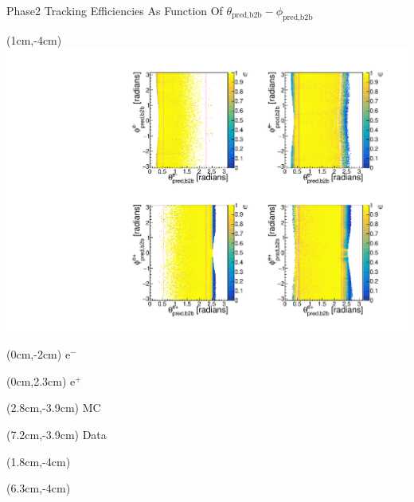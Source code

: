 \documentclass[8pt]{beamer}
\begin{document}
\begin{frame}{Phase2 Tracking Efficiencies As Function Of $\theta_{\textrm{pred,b2b}}-\phi_{\textrm{pred,b2b}}$}
	
	
	
	\begin{textblock*}{9cm}(1cm,-4cm)
		\includegraphics[width=\textwidth]{VPlots/P2/xCEffTP_MCData}
	\end{textblock*}
	
	\begin{textblock*}{2cm}(0cm,-2cm)
		$\textrm{e}^-$
	\end{textblock*}
	
	\begin{textblock*}{2cm}(0cm,2.3cm)
		$\textrm{e}^+$
	\end{textblock*}
	
	
	\begin{textblock*}{2cm}(2.8cm,-3.9cm)
		MC
	\end{textblock*}
	
	\begin{textblock*}{2cm}(7.2cm,-3.9cm)
		Data
	\end{textblock*}
	
	
	
	
	\begin{textblock*}{9cm}(1.8cm,-4cm)
	\end{textblock*}
	
	\begin{textblock*}{9cm}(6.3cm,-4cm)
	\end{textblock*}
	

\end{frame}
\end{document}
